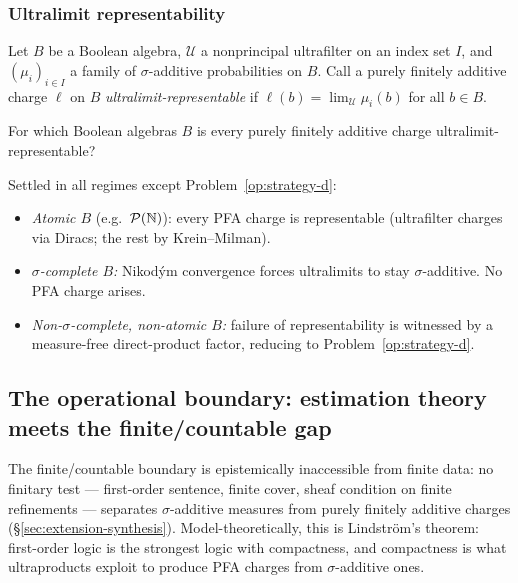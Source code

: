 \subsubsection{Ultralimit representability}

\begin{openproblem}
\label{op:ultralimit}
Let $B$ be a Boolean algebra, $\mathcal{U}$ a nonprincipal
ultrafilter on an index set $I$, and $(\mu_i)_{i \in I}$ a family
of $\sigma$-additive probabilities on $B$.  Call a purely finitely
additive charge $\ell$ on $B$ \emph{ultralimit-representable} if
$\ell(b) = \lim_\mathcal{U}\mu_i(b)$ for all $b \in B$.

For which Boolean algebras $B$ is every purely finitely additive
charge ultralimit-representable?
\end{openproblem}

Settled in all regimes except Problem~\ref{op:strategy-d}:
\begin{itemize}[nosep]
  \item \emph{Atomic $B$} (e.g.\ $\mathcal{P}(\mathbb{N})$): every PFA
    charge is representable (ultrafilter charges via Diracs; the
    rest by Krein--Milman).
  \item \emph{$\sigma$-complete $B$:} Nikod\'{y}m convergence
    \cite[IV.9.8]{DunfordSchwartz1958} forces ultralimits to stay
    $\sigma$-additive.  No PFA charge arises.
  \item \emph{Non-$\sigma$-complete, non-atomic $B$:} failure of
    representability is witnessed by a measure-free direct-product
    factor, reducing to Problem~\ref{op:strategy-d}.
\end{itemize}

\subsection{The operational boundary: estimation theory meets
  the finite/countable gap}
\label{sec:operational-boundary}

The finite/countable boundary is epistemically inaccessible from
finite data: no finitary test --- first-order sentence, finite
cover, sheaf condition on finite refinements --- separates
$\sigma$-additive measures from purely finitely additive charges
(\S\ref{sec:extension-synthesis}).  Model-theoretically, this is
Lindstr\"{o}m's theorem: first-order logic is the strongest logic
with compactness, and compactness is what ultraproducts exploit to
produce PFA charges from $\sigma$-additive ones.

